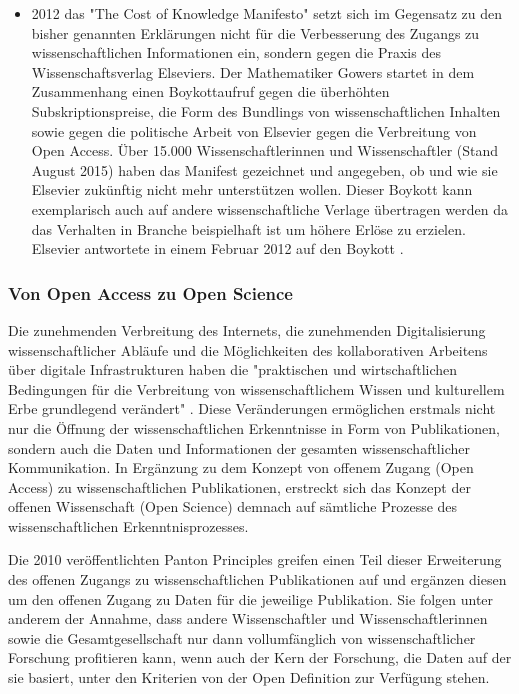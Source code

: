 \begin{itemize}
\item 2012 das "The Cost of Knowledge Manifesto" \cite{Gowers_2012} setzt sich im Gegensatz zu den bisher genannten Erklärungen nicht für die Verbesserung des Zugangs zu wissenschaftlichen Informationen ein, sondern gegen die Praxis des Wissenschaftsverlag Elseviers. Der Mathematiker Gowers startet in dem Zusammenhang einen Boykottaufruf gegen die überhöhten Subskriptionspreise, die Form des Bundlings von wissenschaftlichen Inhalten sowie gegen die politische Arbeit von Elsevier gegen die Verbreitung von Open Access. Über 15.000 Wissenschaftlerinnen und Wissenschaftler (Stand August 2015) haben das Manifest gezeichnet und angegeben, ob und wie sie Elsevier zukünftig nicht mehr unterstützen wollen. Dieser Boykott kann exemplarisch auch auf andere wissenschaftliche Verlage übertragen werden da das Verhalten in Branche beispielhaft ist um höhere Erlöse zu erzielen. Elsevier antwortete in einem Februar 2012 auf den Boykott \cite{elsevier_2012}.
\end{itemize}

\subsubsection{Von Open Access zu Open Science}

Die zunehmenden Verbreitung des Internets, die zunehmenden Digitalisierung wissenschaftlicher Abläufe und die Möglichkeiten des kollaborativen Arbeitens über digitale Infrastrukturen haben die "praktischen und wirtschaftlichen Bedingungen für die Verbreitung von wissenschaftlichem Wissen und kulturellem Erbe grundlegend verändert" \cite{berliner_erklaerung_2003}. Diese Veränderungen ermöglichen erstmals nicht nur die Öffnung der wissenschaftlichen Erkenntnisse in Form von Publikationen, sondern auch die Daten und Informationen der gesamten wissenschaftlicher Kommunikation. In Ergänzung zu dem Konzept von offenem Zugang (Open Access) zu wissenschaftlichen Publikationen, erstreckt sich das Konzept der offenen Wissenschaft (Open Science) demnach auf sämtliche Prozesse des wissenschaftlichen Erkenntnisprozesses.

Die 2010 veröffentlichten Panton Principles \cite{Mounce_2015} greifen einen Teil dieser Erweiterung des offenen Zugangs zu wissenschaftlichen Publikationen auf und ergänzen diesen um den offenen Zugang zu Daten für die jeweilige Publikation. Sie folgen unter anderem der Annahme, dass andere Wissenschaftler und Wissenschaftlerinnen sowie die Gesamtgesellschaft nur dann vollumfänglich von wissenschaftlicher Forschung profitieren kann, wenn auch der Kern der Forschung, die Daten auf der sie basiert, unter den Kriterien von der Open Definition \cite{open_definition} zur Verfügung stehen.

